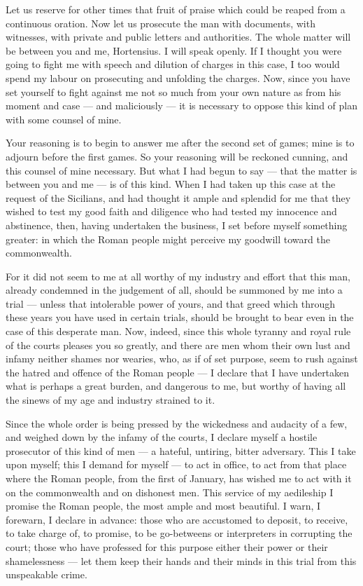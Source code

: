  Let us reserve for other times that fruit of praise which could be reaped from a continuous oration. Now let us prosecute the man with documents, with witnesses, with private and public letters and authorities. The whole matter will be between you and me, Hortensius. I will speak openly. If I thought you were going to fight me with speech and dilution of charges in this case, I too would spend my labour on prosecuting and unfolding the charges. Now, since you have set yourself to fight against me not so much from your own nature as from his moment and case --- and maliciously --- it is necessary to oppose this kind of plan with some counsel of mine.

 Your reasoning is to begin to answer me after the second set of games; mine is to adjourn before the first games. So your reasoning will be reckoned cunning, and this counsel of mine necessary. But what I had begun to say --- that the matter is between you and me --- is of this kind. When I had taken up this case at the request of the Sicilians, and had thought it ample and splendid for me that they wished to test my good faith and diligence who had tested my innocence and abstinence, then, having undertaken the business, I set before myself something greater: in which the Roman people might perceive my goodwill toward the commonwealth.

 For it did not seem to me at all worthy of my industry and effort that this man, already condemned in the judgement of all, should be summoned by me into a trial --- unless that intolerable power of yours, and that greed which through these years you have used in certain trials, should be brought to bear even in the case of this desperate man. Now, indeed, since this whole tyranny and royal rule of the courts pleases you so greatly, and there are men whom their own lust and infamy neither shames nor wearies, who, as if of set purpose, seem to rush against the hatred and offence of the Roman people --- I declare that I have undertaken what is perhaps a great burden, and dangerous to me, but worthy of having all the sinews of my age and industry strained to it.

 Since the whole order is being pressed by the wickedness and audacity of a few, and weighed down by the infamy of the courts, I declare myself a hostile prosecutor of this kind of men --- a hateful, untiring, bitter adversary. This I take upon myself; this I demand for myself --- to act in office, to act from that place where the Roman people, from the first of January, has wished me to act with it on the commonwealth and on dishonest men. This service of my aedileship I promise the Roman people, the most ample and most beautiful. I warn, I forewarn, I declare in advance: those who are accustomed to deposit, to receive, to take charge of, to promise, to be go-betweens or interpreters in corrupting the court; those who have professed for this purpose either their power or their shamelessness --- let them keep their hands and their minds in this trial from this unspeakable crime.

